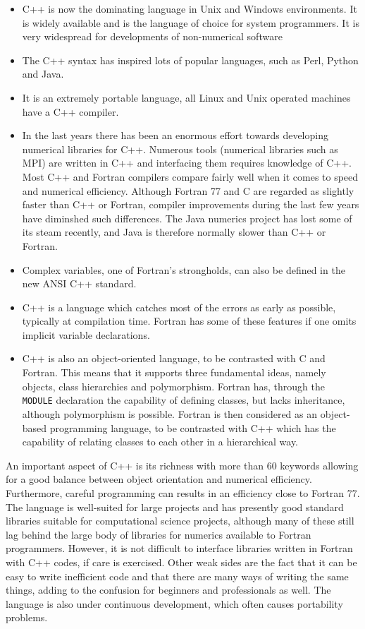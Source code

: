 \begin{itemize}
\item C++ is now the dominating language in Unix and Windows environments. It is widely available and is
the language of choice for system programmers.  It is very widespread for developments of non-numerical  software 
\item The C++ syntax has inspired lots of popular languages, such as Perl, Python and Java.
\item It is an extremely portable language, all Linux and Unix operated machines have a 
C++ compiler.
\item In the last years there has been an enormous effort towards developing numerical libraries
for C++. Numerous tools (numerical libraries such as MPI\cite{gropp1999,mpiref,cmpi}) are written in C++
and interfacing them requires knowledge of C++. 
Most C++ and Fortran compilers compare fairly well when it comes to speed and
numerical efficiency. Although Fortran 77 and C are regarded as slightly faster than C++ or Fortran,
compiler improvements during the last few years have diminshed such differences. The Java numerics project
has lost some of its steam recently, and Java is therefore normally slower than C++ or Fortran.
\item Complex variables, one of Fortran's strongholds, can also be defined in the new 
ANSI C++ standard. 
\item C++ is a language which catches most of the errors as early as possible, typically at compilation
time. Fortran has some of these features if one omits implicit variable declarations.
\item C++ is also an object-oriented language, to be contrasted with C and Fortran.
This means that it supports three fundamental ideas, namely objects, class hierarchies and polymorphism.
Fortran has, through the \verb? MODULE?  declaration the capability of defining classes, but lacks 
inheritance, although polymorphism is possible. Fortran is then considered as an object-based
programming language, to be contrasted with C++ which has the capability of relating classes
to each other in a hierarchical way.
\end{itemize}

An important aspect of C++ is its richness with more than 60 keywords allowing for a good balance between object orientation
and numerical efficiency. Furthermore, careful programming can results in an efficiency close to
Fortran 77.  The language is well-suited for large projects and has presently good standard libraries suitable
for computational science projects, although many of these still lag behind the large body of libraries for numerics
available to Fortran programmers. However, it is not difficult to interface libraries written in Fortran with C++
codes, if care is exercised.
Other weak sides are the fact that it can be easy to write inefficient code  and that there are many ways of writing the
same things, adding to the confusion for beginners  and professionals as well.  The language is also under continuous
development, which often causes portability problems.

